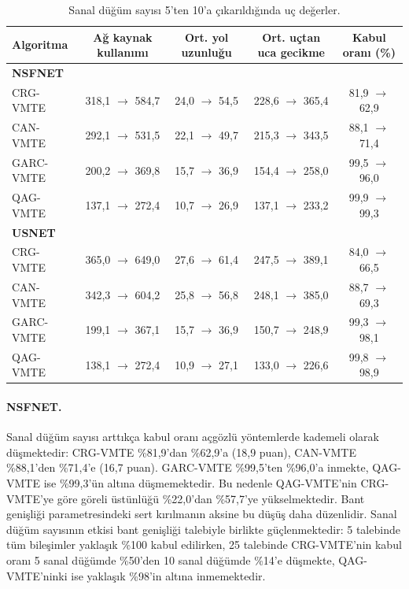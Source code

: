 \documentclass[10pt,twocolumn]{article}
\begin{document}
\begin{table}[!t]
\centering
\caption{Sanal düğüm sayısı 5'ten 10'a çıkarıldığında uç değerler.}
\label{tab:vnode}
\small
\begin{tabular}{lcccc}
\toprule
Algoritma & Ağ kaynak kullanımı & Ort. yol uzunluğu & Ort. uçtan uca gecikme & Kabul oranı (\%) \\
\midrule
\multicolumn{5}{l}{\textbf{NSFNET}} \\
CRG-VMTE & 318,1 $\rightarrow$ 584,7 & 24,0 $\rightarrow$ 54,5 & 228,6 $\rightarrow$ 365,4 & 81,9 $\rightarrow$ 62,9 \\
CAN-VMTE & 292,1 $\rightarrow$ 531,5 & 22,1 $\rightarrow$ 49,7 & 215,3 $\rightarrow$ 343,5 & 88,1 $\rightarrow$ 71,4 \\
GARC-VMTE & 200,2 $\rightarrow$ 369,8 & 15,7 $\rightarrow$ 36,9 & 154,4 $\rightarrow$ 258,0 & 99,5 $\rightarrow$ 96,0 \\
QAG-VMTE & 137,1 $\rightarrow$ 272,4 & 10,7 $\rightarrow$ 26,9 & 137,1 $\rightarrow$ 233,2 & 99,9 $\rightarrow$ 99,3 \\
\midrule
\multicolumn{5}{l}{\textbf{USNET}} \\
CRG-VMTE & 365,0 $\rightarrow$ 649,0 & 27,6 $\rightarrow$ 61,4 & 247,5 $\rightarrow$ 389,1 & 84,0 $\rightarrow$ 66,5 \\
CAN-VMTE & 342,3 $\rightarrow$ 604,2 & 25,8 $\rightarrow$ 56,8 & 248,1 $\rightarrow$ 385,0 & 88,7 $\rightarrow$ 69,3 \\
GARC-VMTE & 199,1 $\rightarrow$ 367,1 & 15,7 $\rightarrow$ 36,9 & 150,7 $\rightarrow$ 248,9 & 99,3 $\rightarrow$ 98,1 \\
QAG-VMTE & 138,1 $\rightarrow$ 272,4 & 10,9 $\rightarrow$ 27,1 & 133,0 $\rightarrow$ 226,6 & 99,8 $\rightarrow$ 98,9 \\
\bottomrule
\end{tabular}
\end{table}

\paragraph{NSFNET.} Sanal düğüm sayısı arttıkça kabul oranı açgözlü yöntemlerde kademeli olarak düşmektedir: CRG-VMTE \%81,9'dan \%62,9'a (18,9 puan), CAN-VMTE \%88,1'den \%71,4'e (16,7 puan). GARC-VMTE \%99,5'ten \%96,0'a inmekte, QAG-VMTE ise \%99,3'ün altına düşmemektedir. Bu nedenle QAG-VMTE'nin CRG-VMTE'ye göre göreli üstünlüğü \%22,0'dan \%57,7'ye yükselmektedir. Bant genişliği parametresindeki sert kırılmanın aksine bu düşüş daha düzenlidir. Sanal düğüm sayısının etkisi bant genişliği talebiyle birlikte güçlenmektedir: 5 talebinde tüm bileşimler yaklaşık \%100 kabul edilirken, 25 talebinde CRG-VMTE'nin kabul oranı 5 sanal düğümde \%50'den 10 sanal düğümde \%14'e düşmekte, QAG-VMTE'ninki ise yaklaşık \%98'in altına inmemektedir.
\end{document}
